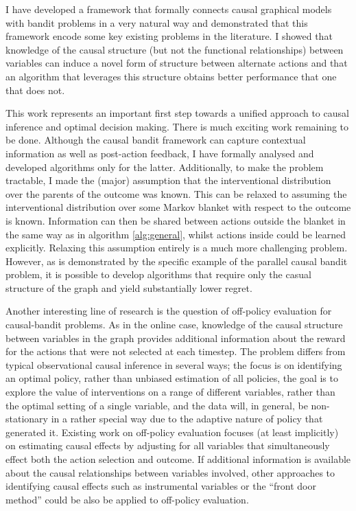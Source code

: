 \documentclass[11pt,a4paper,twoside]{report}
\newcommand{\quotes}[1]{``#1''}
\theoremstyle{plain}
\theoremstyle{definition}
\begin{document}
I have developed a framework that formally connects causal graphical models with bandit problems in a very natural way and demonstrated that this framework encode some key existing problems in the literature. I showed that knowledge of the causal structure (but not the functional relationships) between variables can induce a novel form of structure between alternate actions and that an algorithm that leverages this structure obtains better performance that one that does not. 

This work represents an important first step towards a unified approach to causal inference and optimal decision making. There is much exciting work remaining to be done. Although the causal bandit framework can capture contextual information as well as post-action feedback, I have formally analysed and developed algorithms only for the latter. Additionally, to make the problem tractable, I made the (major) assumption that the interventional distribution over the parents of the outcome was known. This can be relaxed to assuming the interventional distribution over some Markov blanket with respect to the outcome is known. Information can then be shared between actions outside the blanket in the same way as in algorithm \ref{alg:general}, whilst actions inside could be learned explicitly. Relaxing this assumption entirely is a much more challenging problem. However, as is demonstrated by the specific example of the parallel causal bandit problem, it is possible to develop algorithms that require only the casual structure of the graph and yield substantially lower regret.

Another interesting line of research is the question of off-policy evaluation for causal-bandit problems. As in the online case, knowledge of the causal structure between variables in the graph provides additional information about the reward for the actions that were not selected at each timestep. The problem differs from typical observational causal inference in several ways; the focus is on identifying an optimal policy, rather than unbiased estimation of all policies, the goal is to explore the value of interventions on a range of different variables, rather than the optimal setting of a single variable, and the data will, in general, be non-stationary in a rather special way due to the adaptive nature of policy that generated it. Existing work on off-policy evaluation focuses (at least implicitly) on estimating causal effects by adjusting for all variables that simultaneously effect both the action selection and outcome. If additional information is available about the causal relationships between variables involved, other approaches to identifying causal effects such as instrumental variables or the \quotes{front door method} \citep{Pearl2000} could be also be applied to off-policy evaluation. 
\end{document}
